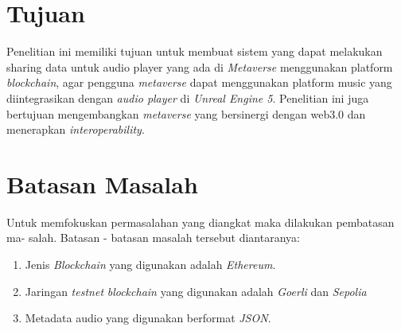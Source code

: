 \section{Tujuan}
\label{sec:Tujuan}

Penelitian ini memiliki tujuan untuk membuat sistem yang
dapat melakukan sharing data untuk audio player yang ada
di \emph{Metaverse} menggunakan platform \emph{blockchain}, agar
pengguna \emph{metaverse} dapat menggunakan platform music
yang diintegrasikan dengan \emph{audio player} di \emph{Unreal Engine 5}. Penelitian ini juga bertujuan mengembangkan \emph{metaverse} yang
bersinergi dengan web3.0 dan menerapkan \emph{interoperability}.

\section{Batasan Masalah}
\label{sec:batasanmasalah}

Untuk memfokuskan permasalahan yang diangkat maka dilakukan pembatasan ma-
salah. Batasan - batasan masalah tersebut diantaranya:
\begin{enumerate}
  \item Jenis \emph{Blockchain} yang digunakan adalah \emph{Ethereum}.
  \item Jaringan \emph{testnet} \emph{blockchain} yang digunakan adalah \emph{Goerli} dan \emph{Sepolia}
  \item Metadata audio yang digunakan berformat \emph{JSON}.
\end{enumerate}

